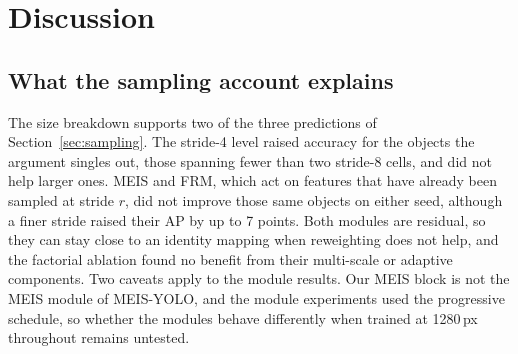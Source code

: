 \documentclass[preprint,12pt]{elsarticle}
\begin{document}
\begin{table}[t]
\centering
\caption{Reported VisDrone-DET2019 results with their evaluation protocols. The
rows are not directly comparable.}
\label{tab:published}
\small
{}
\end{table}

\section{Discussion}
\label{sec:discussion}

\subsection{What the sampling account explains}

The size breakdown supports two of the three predictions of
Section~\ref{sec:sampling}. The stride-4 level raised accuracy for the objects the
argument singles out, those spanning fewer than two stride-8 cells, and did not
help larger ones. MEIS and FRM, which act on features that have already
been sampled at stride $r$, did not improve those same objects on either seed,
although a finer stride raised their AP by up to 7 points. Both modules are
residual, so they can stay close to an identity mapping when reweighting does not
help, and the factorial ablation found no benefit from their multi-scale or
adaptive components. Two caveats apply to the module results. Our MEIS block is
not the MEIS module of MEIS-YOLO, and the module experiments used the progressive
schedule, so whether the modules behave differently when trained at 1280\,px
throughout remains untested.
\end{document}
